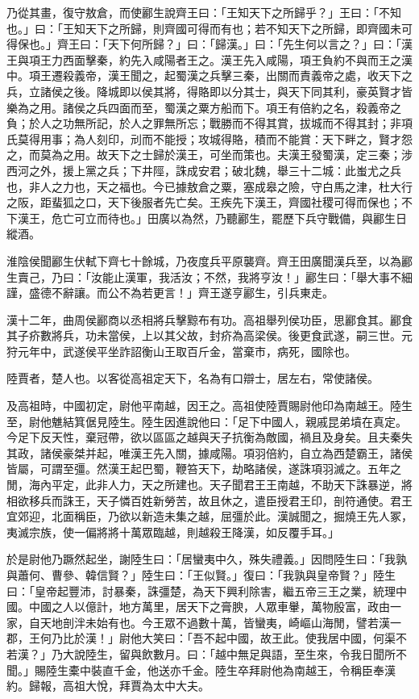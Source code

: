 \begin{pinyinscope}
乃從其畫，復守敖倉，而使酈生說齊王曰：「王知天下之所歸乎？」王曰：「不知也。」曰：「王知天下之所歸，則齊國可得而有也；若不知天下之所歸，即齊國未可得保也。」齊王曰：「天下何所歸？」曰：「歸漢。」曰：「先生何以言之？」曰：「漢王與項王力西面擊秦，約先入咸陽者王之。漢王先入咸陽，項王負約不與而王之漢中。項王遷殺義帝，漢王聞之，起蜀漢之兵擊三秦，出關而責義帝之處，收天下之兵，立諸侯之後。降城即以侯其將，得賂即以分其士，與天下同其利，豪英賢才皆樂為之用。諸侯之兵四面而至，蜀漢之粟方船而下。項王有倍約之名，殺義帝之負；於人之功無所記，於人之罪無所忘；戰勝而不得其賞，拔城而不得其封；非項氏莫得用事；為人刻印，刓而不能授；攻城得賂，積而不能賞：天下畔之，賢才怨之，而莫為之用。故天下之士歸於漢王，可坐而策也。夫漢王發蜀漢，定三秦；涉西河之外，援上黨之兵；下井陘，誅成安君；破北魏，舉三十二城：此蚩尤之兵也，非人之力也，天之福也。今已據敖倉之粟，塞成皋之險，守白馬之津，杜大行之阪，距蜚狐之口，天下後服者先亡矣。王疾先下漢王，齊國社稷可得而保也；不下漢王，危亡可立而待也。」田廣以為然，乃聽酈生，罷歷下兵守戰備，與酈生日縱酒。

淮陰侯聞酈生伏軾下齊七十餘城，乃夜度兵平原襲齊。齊王田廣聞漢兵至，以為酈生賣己，乃曰：「汝能止漢軍，我活汝；不然，我將亨汝！」酈生曰：「舉大事不細謹，盛德不辭讓。而公不為若更言！」齊王遂亨酈生，引兵東走。

漢十二年，曲周侯酈商以丞相將兵擊黥布有功。高祖舉列侯功臣，思酈食其。酈食其子疥數將兵，功未當侯，上以其父故，封疥為高梁侯。後更食武遂，嗣三世。元狩元年中，武遂侯平坐詐詔衡山王取百斤金，當棄市，病死，國除也。

陸賈者，楚人也。以客從高祖定天下，名為有口辯士，居左右，常使諸侯。

及高祖時，中國初定，尉他平南越，因王之。高祖使陸賈賜尉他印為南越王。陸生至，尉他魋結箕倨見陸生。陸生因進說他曰：「足下中國人，親戚昆弟墳在真定。今足下反天性，棄冠帶，欲以區區之越與天子抗衡為敵國，禍且及身矣。且夫秦失其政，諸侯豪桀并起，唯漢王先入關，據咸陽。項羽倍約，自立為西楚霸王，諸侯皆屬，可謂至彊。然漢王起巴蜀，鞭笞天下，劫略諸侯，遂誅項羽滅之。五年之閒，海內平定，此非人力，天之所建也。天子聞君王王南越，不助天下誅暴逆，將相欲移兵而誅王，天子憐百姓新勞苦，故且休之，遣臣授君王印，剖符通使。君王宜郊迎，北面稱臣，乃欲以新造未集之越，屈彊於此。漢誠聞之，掘燒王先人冢，夷滅宗族，使一偏將將十萬眾臨越，則越殺王降漢，如反覆手耳。」

於是尉他乃蹶然起坐，謝陸生曰：「居蠻夷中久，殊失禮義。」因問陸生曰：「我孰與蕭何、曹參、韓信賢？」陸生曰：「王似賢。」復曰：「我孰與皇帝賢？」陸生曰：「皇帝起豐沛，討暴秦，誅彊楚，為天下興利除害，繼五帝三王之業，統理中國。中國之人以億計，地方萬里，居天下之膏腴，人眾車轝，萬物殷富，政由一家，自天地剖泮未始有也。今王眾不過數十萬，皆蠻夷，崎嶇山海閒，譬若漢一郡，王何乃比於漢！」尉他大笑曰：「吾不起中國，故王此。使我居中國，何渠不若漢？」乃大說陸生，留與飲數月。曰：「越中無足與語，至生來，令我日聞所不聞。」賜陸生橐中裝直千金，他送亦千金。陸生卒拜尉他為南越王，令稱臣奉漢約。歸報，高祖大悅，拜賈為太中大夫。


\end{pinyinscope}
